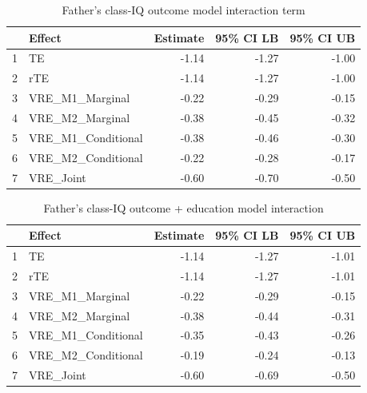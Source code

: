 \documentclass[12pt]{article} %
\numberwithin{equation}{section} %
\begin{document}
\begin{table}[ht]
\centering
\begin{tabular}{rlrrr}
  \hline
 & Effect & Estimate & 95\% CI LB & 95\% CI UB \\ 
  \hline
1 & TE & -1.14 & -1.27 & -1.00 \\ 
  2 & rTE & -1.14 & -1.27 & -1.00 \\ 
  3 & VRE\_M1\_Marginal & -0.22 & -0.29 & -0.15 \\ 
  4 & VRE\_M2\_Marginal & -0.38 & -0.45 & -0.32 \\ 
  5 & VRE\_M1\_Conditional & -0.38 & -0.46 & -0.30 \\ 
  6 & VRE\_M2\_Conditional & -0.22 & -0.28 & -0.17 \\ 
  7 & VRE\_Joint & -0.60 & -0.70 & -0.50 \\ 
   \hline
\end{tabular}
\caption{Father's class-IQ outcome model interaction term}
\end{table}

\begin{table}[ht]
\centering
\begin{tabular}{rlrrr}
  \hline
 & Effect & Estimate & 95\% CI LB & 95\% CI UB \\ 
  \hline
1 & TE & -1.14 & -1.27 & -1.01 \\ 
  2 & rTE & -1.14 & -1.27 & -1.01 \\ 
  3 & VRE\_M1\_Marginal & -0.22 & -0.29 & -0.15 \\ 
  4 & VRE\_M2\_Marginal & -0.38 & -0.44 & -0.31 \\ 
  5 & VRE\_M1\_Conditional & -0.35 & -0.43 & -0.26 \\ 
  6 & VRE\_M2\_Conditional & -0.19 & -0.24 & -0.13 \\ 
  7 & VRE\_Joint & -0.60 & -0.69 & -0.50 \\ 
   \hline
\end{tabular}
\caption{Father's class-IQ outcome + education model interaction}
\end{table}
\end{document}
